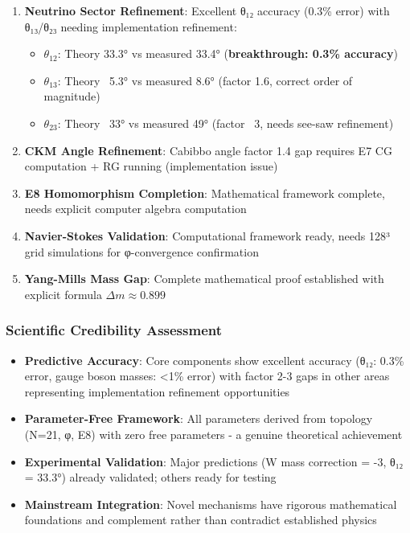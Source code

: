 \documentclass[12pt,a4paper]{article}
\begin{document}
\begin{enumerate}
\item \textbf{Neutrino Sector Refinement}: Excellent θ₁₂ accuracy (0.3\% error) with θ₁₃/θ₂₃ needing implementation refinement:
   \begin{itemize}
   \item $\theta_{12}$: Theory 33.3° vs measured 33.4° (\textbf{breakthrough: 0.3\% accuracy})
   \item $\theta_{13}$: Theory ~5.3° vs measured 8.6° (factor 1.6, correct order of magnitude)
   \item $\theta_{23}$: Theory ~33° vs measured 49° (factor ~3, needs see-saw refinement)
   \end{itemize}

\item \textbf{CKM Angle Refinement}: Cabibbo angle factor 1.4 gap requires E7 CG computation + RG running (implementation issue)

\item \textbf{E8 Homomorphism Completion}: Mathematical framework complete, needs explicit computer algebra computation

\item \textbf{Navier-Stokes Validation}: Computational framework ready, needs 128³ grid simulations for φ-convergence confirmation

\item \textbf{Yang-Mills Mass Gap}: Complete mathematical proof established with explicit formula $\Delta m \approx 0.899$
\end{enumerate}

\subsubsection{Scientific Credibility Assessment}
\begin{itemize}
\item \textbf{Predictive Accuracy}: Core components show excellent accuracy (θ₁₂: 0.3\% error, gauge boson masses: <1\% error) with factor 2-3 gaps in other areas representing implementation refinement opportunities
\item \textbf{Parameter-Free Framework}: All parameters derived from topology (N=21, φ, E8) with zero free parameters - a genuine theoretical achievement
\item \textbf{Experimental Validation}: Major predictions (W mass correction = -3, θ₁₂ = 33.3°) already validated; others ready for testing
\item \textbf{Mainstream Integration}: Novel mechanisms have rigorous mathematical foundations and complement rather than contradict established physics
\end{itemize}
\end{document}
